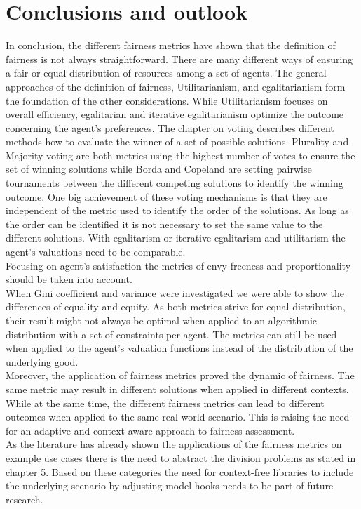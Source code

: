 \documentclass[german, a4paper, 11pt, oneside]{scrbook}
\begin{document}
\chapter{Conclusions and outlook}
In conclusion, the different fairness metrics have shown that the definition of fairness is not always straightforward. There are many different ways of ensuring a fair or equal distribution of resources among a set of agents. The general approaches of the definition of fairness, Utilitarianism, and egalitarianism form the foundation of the other considerations. While Utilitarianism focuses on overall efficiency, egalitarian and iterative egalitarianism optimize the outcome concerning the agent's preferences. The chapter on voting describes different methods how to evaluate the winner of a set of possible solutions. Plurality and Majority voting are both metrics using the highest number of votes to ensure the set of winning solutions while Borda and Copeland are setting pairwise tournaments between the different competing solutions to identify the winning outcome. One big achievement of these voting mechanisms is that they are independent of the metric used to identify the order of the solutions. As long as the order can be identified it is not necessary to set the same value to the different solutions. With egalitarism or iterative egalitarism and utilitarism the agent's valuations need to be comparable. \\Focusing on agent's satisfaction the metrics of envy-freeness and proportionality should be taken into account.
\\When Gini coefficient and variance were investigated we were able to show the differences of equality and equity. As both metrics strive for equal distribution, their result might not always be optimal when applied to an algorithmic distribution with a set of constraints per agent. The metrics can still be used when applied to the agent's valuation functions instead of the distribution of the underlying good.
\\Moreover, the application of fairness metrics proved the dynamic of fairness. The same metric may result in different solutions when applied in different contexts. While at the same time, the different fairness metrics can lead to different outcomes when applied to the same real-world scenario. This is raising the need for an adaptive and context-aware approach to fairness assessment. \\As the literature has already shown the applications of the fairness metrics on example use cases there is the need to abstract the division problems as stated in chapter 5. Based on these categories the need for context-free libraries to include the underlying scenario by adjusting model hooks needs to be part of future research. 
\newpage

\end{document}
